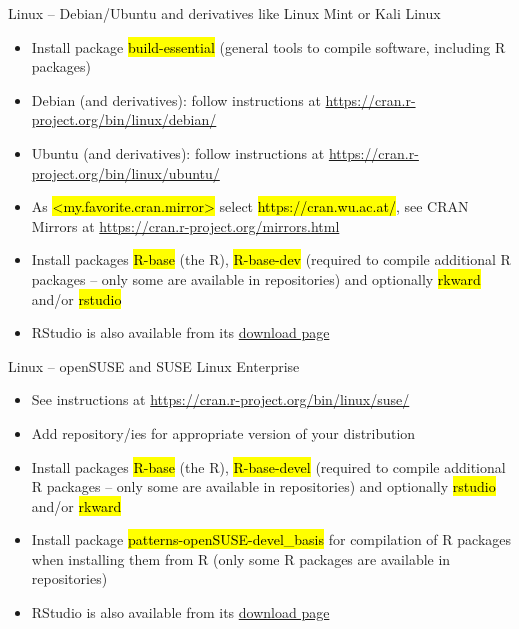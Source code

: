 \documentclass[compress, ucs, xelatex, 11pt, xcolor=svgnames,
  hyperref={
    bookmarks=true,
    unicode=true,
    colorlinks=true,
    pdftitle={Molecular data in R},
    plainpages=false,
    pdfauthor={Vojtech Zeisek},
    pdfsubject={Course about phylogeny and evolution in R},
    pdfcreator={XeLaTeX},
    pdfkeywords={R, evolution, phylogeny, molecular data},
    linkcolor=Tomato,
    anchorcolor=SaddleBrown,
    citecolor=Goldenrod,
    filecolor=DarkMagenta,
    menucolor=Sienna,
    urlcolor=DarkTurquoise,
    pdftex},
  url={hyphens, lowtilde} %
  ]{beamer}
\renewcommand{\texttt}[1]{\hl{\ttfamily #1}}
\begin{document}
\begin{frame}{Linux -- Debian/Ubuntu and derivatives like Linux Mint or Kali Linux}
  \begin{itemize}
    \item Install package \texttt{build-essential} (general tools to compile software, including R packages)
    \item Debian (and derivatives): follow instructions at \url{https://cran.r-project.org/bin/linux/debian/}
    \item Ubuntu (and derivatives): follow instructions at \url{https://cran.r-project.org/bin/linux/ubuntu/}
    \item As \texttt{<my.favorite.cran.mirror>} select \alert{\texttt{https://cran.wu.ac.at/}}, see \alert{CRAN Mirrors} at \url{https://cran.r-project.org/mirrors.html}
    \item Install packages \texttt{R-base} (the R), \texttt{R-base-dev} (required to compile additional R packages -- only some are available in repositories) and optionally \texttt{rkward} and/or \texttt{rstudio}
    \item RStudio is also available from its \href{https://www.rstudio.com/products/rstudio/download/\#download}{download page}
  \end{itemize}
\end{frame}

\begin{frame}{Linux -- openSUSE and SUSE Linux Enterprise}
  \begin{itemize}
    \item See instructions at \url{https://cran.r-project.org/bin/linux/suse/}
    \item Add repository/ies for appropriate version of your distribution
    \begin{itemize}
    \end{itemize}
    \item Install packages \texttt{R-base} (the R), \texttt{R-base-devel} (required to compile additional R packages -- only some are available in repositories) and optionally \texttt{rstudio} and/or \texttt{rkward}
    \item Install package \texttt{patterns-openSUSE-devel\_basis} for compilation of R packages when installing them from R (only some R packages are available in repositories)
    \item RStudio is also available from its \href{https://www.rstudio.com/products/rstudio/download/\#download}{download page}
  \end{itemize}
\end{frame}
\end{document}
